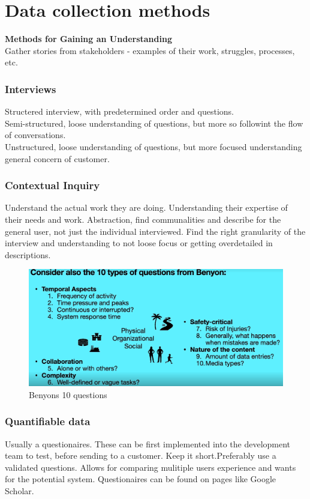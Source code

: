 \chapter{Data collection methods}
{\large \textbf{Methods for Gaining an Understanding}}\\
Gather stories from stakeholders - examples of their work, struggles, processes, etc.

\subsection*{Interviews}
Structered interview, with predetermined order and questions.\\
Semi-structured, loose understanding of questions, but more so followint the flow of conversations.\\
Unstructured, loose understanding of questions, but more focused understanding general concern of customer.

\subsection*{Contextual Inquiry}
Understand the actual work they are doing. Understanding their expertise of their needs and work. Abstraction, find communalities and describe for the general user, not just the individual interviewed. Find the right granularity of the interview and understanding to not loose focus or getting overdetailed in descriptions.

\begin{figure}[H]
    \begin{center}
        \includegraphics*[width=\linewidth*3/4]{chapters/data_collection/figures/benyon.png}        
    \end{center}
    \caption{Benyons 10 questions}
    \label{fig:benyon}
\end{figure}

\subsection*{Quantifiable data}
Usually a questionaires. These can be first implemented into the development team to test, before sending to a customer. Keep it short.Preferably use a validated questions. Allows for comparing mulitiple users experience and wants for the potential system. Questionaires can be found on pages like Google Scholar.

